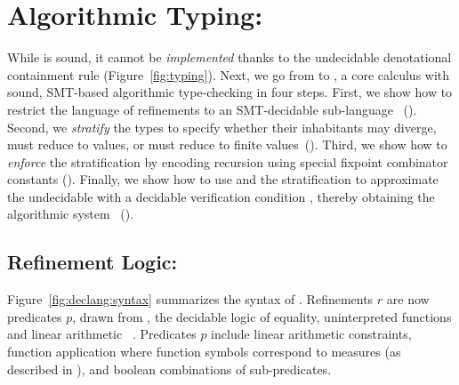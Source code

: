 \renewcommand\rimpl{\rsubbase}
\renewcommand{\rtdimp}{\rsubbased}
%
\section{Algorithmic Typing: \declang}\label{sec:typing}



While \undeclang is sound, it cannot be \emph{implemented} 
thanks to the undecidable denotational containment rule \rsubbase
(Figure~\ref{fig:typing}).
%
Next, we go from \undeclang to \declang, a core calculus 
with sound, SMT-based algorithmic type-checking in four 
steps.
%
First, we show how to restrict the language of 
refinements to an SMT-decidable sub-language 
\logiclang~().
%
Second, we \emph{stratify} the types to specify 
whether their inhabitants may diverge, must reduce
to values, or must reduce to finite values~().
%
Third, we show how to \emph{enforce} the stratification
by encoding recursion using special fixpoint combinator 
constants ().
%
Finally, we show how to use \logiclang and the 
stratification to approximate the undecidable \rsubbase
with a decidable verification condition \rsubbased, thereby 
obtaining the algorithmic system \declang~().


\subsection{Refinement Logic: \logiclang}\label{sec:typing:logic}

Figure~\ref{fig:declang:syntax} summarizes the syntax of \declang.
Refinements $r$ are now predicates $p$, drawn from 
\logiclang, the decidable logic of equality, 
uninterpreted functions and linear arithmetic
~\cite{Nelson81}.
%
Predicates $p$ include linear arithmetic constraints,
function application where function symbols correspond
to measures (as described in ), and 
boolean combinations of sub-predicates.


